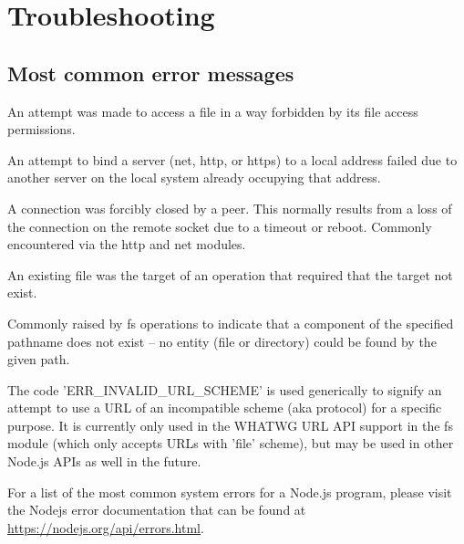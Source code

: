 \section{Troubleshooting}\label{Troubleshooting}

\subsection{Most common error messages}

An attempt was made to access a file in a way forbidden by its file access permissions.

An attempt to bind a server (net, http, or https) to a local address failed due to another server on the local system already occupying that address.

A connection was forcibly closed by a peer. This normally results from a loss of the connection on the remote socket due to a timeout or reboot. Commonly encountered via the http and net modules.

An existing file was the target of an operation that required that the target not exist.

Commonly raised by fs operations to indicate that a component of the specified pathname does not exist -- no entity (file or directory) could be found by the given path.

The code 'ERR\_INVALID\_URL\_SCHEME' is used generically to signify an attempt to use a URL of an incompatible scheme (aka protocol) for a specific purpose. It is currently only used in the WHATWG URL API support in the fs module (which only accepts URLs with 'file' scheme), but may be used in other Node.js APIs as well in the future.

For a list of the most common system errors for a Node.js program, please visit the Nodejs error documentation that can be found at  \url{https://nodejs.org/api/errors.html}.
